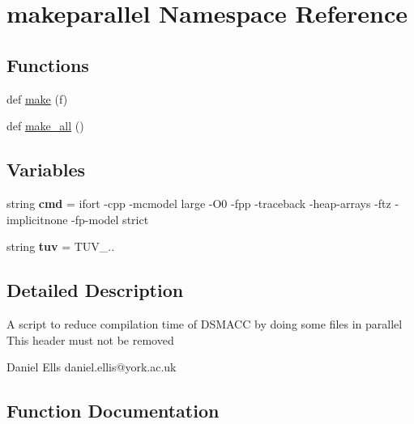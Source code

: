\hypertarget{namespacemakeparallel}{}\section{makeparallel Namespace Reference}
\label{namespacemakeparallel}
\subsection*{Functions}
\begin{DoxyCompactItemize}
\item 
def \mbox{\hyperlink{namespacemakeparallel_afa44c3440c004029068f5ac7738d0d26}{make}} (f)
\item 
def \mbox{\hyperlink{namespacemakeparallel_a8efd375d839b5b7bc78f108de8ceb703}{make\+\_\+all}} ()
\end{DoxyCompactItemize}
\subsection*{Variables}
\begin{DoxyCompactItemize}
\item 
\mbox{\label{namespacemakeparallel_a489798aad1f515e949f758627b301bdb}} 
string {\bfseries cmd} = \textquotesingle{}ifort -\/cpp -\/mcmodel large -\/O0 -\/fpp -\/traceback -\/heap-\/arrays -\/ftz -\/implicitnone -\/fp-\/model strict \textquotesingle{}
\item 
\mbox{\label{namespacemakeparallel_a51f9f710eb55720e89049a87f4370537}} 
string {\bfseries tuv} = \textquotesingle{}T\+U\+V\+\_..\textquotesingle{}
\end{DoxyCompactItemize}


\subsection{Detailed Description}
\begin{DoxyVerb}A script to reduce compilation time of DSMACC by doing some files in parallel
This header must not be removed

Daniel Ells
daniel.ellis@york.ac.uk
\end{DoxyVerb}
 

\subsection{Function Documentation}
\mbox{\label{namespacemakeparallel_afa44c3440c004029068f5ac7738d0d26}} 

